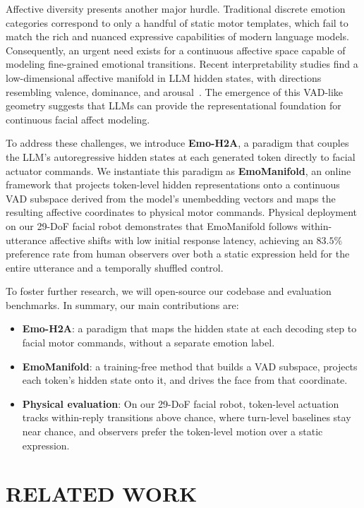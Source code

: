 \documentclass[letterpaper, 10 pt, conference]{ieeeconf}
\begin{document}
Affective diversity presents another major hurdle. Traditional discrete emotion categories correspond to only a handful of static motor templates, which fail to match the rich and nuanced expressive capabilities of modern language models. Consequently, an urgent need exists for a continuous affective space capable of modeling fine-grained emotional transitions. Recent interpretability studies find a low-dimensional affective manifold in LLM hidden states, with directions resembling valence, dominance, and arousal~\cite{reichman2026emotions}. The emergence of this VAD-like geometry suggests that LLMs can provide the representational foundation for continuous facial affect modeling.

To address these challenges, we introduce \textbf{Emo-H2A}, a paradigm that couples the LLM's autoregressive hidden states at each generated token directly to facial actuator commands. We instantiate this paradigm as \textbf{EmoManifold}, an online framework that projects token-level hidden representations onto a continuous VAD subspace derived from the model's unembedding vectors and maps the resulting affective coordinates to physical motor commands. Physical deployment on our 29-DoF facial robot demonstrates that EmoManifold follows within-utterance affective shifts with low initial response latency, achieving an $83.5\%$ preference rate from human observers over both a static expression held for the entire utterance and a temporally shuffled control.

To foster further research, we will open-source our codebase and evaluation benchmarks. In summary, our main contributions are:
\begin{itemize}
\item \textbf{Emo-H2A}: a paradigm that maps the hidden state at each decoding step to facial motor commands, without a separate emotion label.
\item \textbf{EmoManifold}: a training-free method that builds a VAD subspace, projects each token's hidden state onto it, and drives the face from that coordinate.
\item \textbf{Physical evaluation}: On our 29-DoF facial robot, token-level actuation tracks within-reply transitions above chance, where turn-level baselines stay near chance, and observers prefer the token-level motion over a static expression.
\end{itemize}

\section{RELATED WORK}
\label{sec:related}
\end{document}
